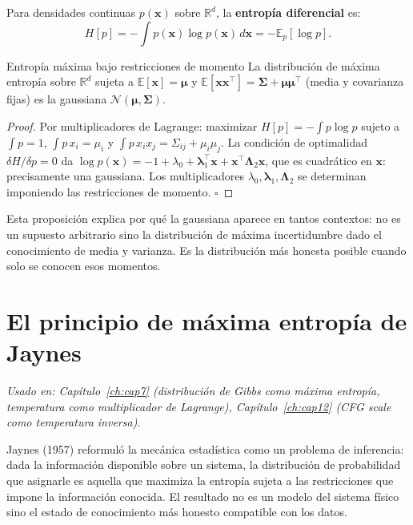 Para densidades continuas $p(\bm{x})$ sobre $\mathbb{R}^d$, la
\textbf{entropía diferencial} es:
\begin{equation}
  H[p] = -\int p(\bm{x})\log p(\bm{x})\,d\bm{x} = -\mathbb{E}_p[\log p].
  \label{eq:ap_entropia_cont}
\end{equation}

\begin{proposicion}{Entropía máxima bajo restricciones de momento}
\label{prop:ap_maxent}
La distribución de máxima entropía sobre $\mathbb{R}^d$ sujeta a
$\mathbb{E}[\bm{x}] = \bm{\mu}$ y $\mathbb{E}[\bm{x}\bm{x}^\top] = \bm{\Sigma}
+ \bm{\mu}\bm{\mu}^\top$ (media y covarianza fijas) es la gaussiana
$\mathcal{N}(\bm{\mu},\bm{\Sigma})$.
\end{proposicion}

\begin{proof}
Por multiplicadores de Lagrange: maximizar $H[p] = -\int p\log p$ sujeto a
$\int p = 1$, $\int p\,x_i = \mu_i$ y $\int p\,x_ix_j = \Sigma_{ij}+\mu_i\mu_j$.
La condición de optimalidad $\delta H/\delta p = 0$ da
$\log p(\bm{x}) = -1 + \lambda_0 + \bm{\lambda}_1^\top\bm{x} +
\bm{x}^\top\bm{\Lambda}_2\bm{x}$, que es cuadrático en $\bm{x}$: precisamente
una gaussiana. Los multiplicadores $\lambda_0, \bm{\lambda}_1, \bm{\Lambda}_2$
se determinan imponiendo las restricciones de momento. $\square$
\end{proof}

Esta proposición explica por qué la gaussiana aparece en tantos contextos: no
es un supuesto arbitrario sino la distribución de máxima incertidumbre dado
el conocimiento de media y varianza. Es la distribución más honesta posible
cuando solo se conocen esos momentos.

\section{El principio de máxima entropía de Jaynes}
\label{sec:ap_jaynes}

\textit{Usado en: Capítulo~\ref{ch:cap7} (distribución de Gibbs como máxima
entropía, temperatura como multiplicador de Lagrange), Capítulo~\ref{ch:cap12}
(CFG scale como temperatura inversa).}

\medskip
Jaynes (1957) reformuló la mecánica estadística como un problema de inferencia:
dada la información disponible sobre un sistema, la distribución de probabilidad
que asignarle es aquella que maximiza la entropía sujeta a las restricciones
que impone la información conocida. El resultado no es un modelo del sistema
físico sino el estado de conocimiento más honesto compatible con los datos.

